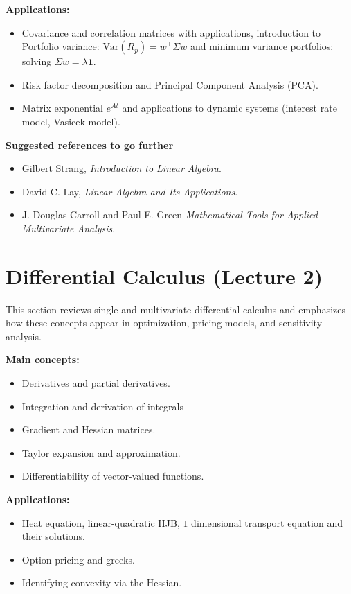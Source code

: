 \documentclass[12pt,a4paper]{article}
\begin{document}
\textbf{Applications:}
\begin{itemize}[itemsep=-4pt, topsep=2pt]
    \item Covariance and correlation matrices with applications, introduction to Portfolio variance: $\text{Var}(R_p) = w^{\top}\Sigma w$ and minimum variance portfolios: solving $\Sigma w = \lambda \mathbf{1}$.
    \item Risk factor decomposition and Principal Component Analysis (PCA).
    \item Matrix exponential $e^{A t}$ and applications to dynamic systems (interest rate model, Vasicek model).
\end{itemize}

\textbf{Suggested references to go further}
\begin{itemize}[itemsep=-4pt, topsep=2pt]
    \item Gilbert Strang, \textit{Introduction to Linear Algebra}.
    \item David C. Lay, \textit{Linear Algebra and Its Applications}.
    \item J. Douglas Carroll and Paul E. Green \textit{Mathematical Tools for Applied Multivariate Analysis}.
\end{itemize}

\section{Differential Calculus (Lecture 2)}
This section reviews single and multivariate differential calculus and emphasizes how these concepts appear in optimization, pricing models, and sensitivity analysis.

\textbf{Main concepts:}
\begin{itemize}[itemsep=-4pt, topsep=2pt]
    \item Derivatives and partial derivatives.
    \item Integration and derivation of integrals
    \item Gradient and Hessian matrices.
    \item Taylor expansion and approximation.
    \item Differentiability of vector-valued functions.
\end{itemize}

\textbf{Applications:}
\begin{itemize}[itemsep=-4pt, topsep=2pt]
    \item Heat equation, linear-quadratic HJB, $1$ dimensional transport equation and their solutions.
    \item Option pricing and greeks.
    \item Identifying convexity via the Hessian.
\end{itemize}
\end{document}
